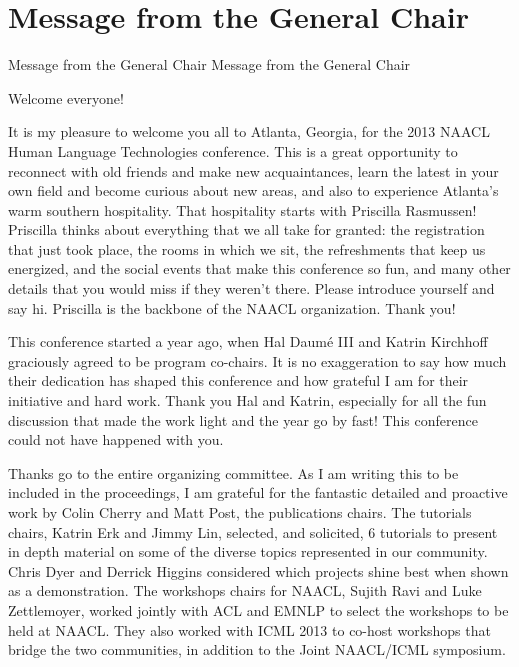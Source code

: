 \section*{Message from the General Chair}\vspace{2em}
\setheaders%
    {Message from the General Chair}%
    {Message from the General Chair}
\thispagestyle{emptyheader}
\begin{large}
\setlength{\parskip}{1ex}

\noindent Welcome everyone!

It is my pleasure to welcome you all to Atlanta, Georgia, for the 2013 NAACL Human Language Technologies conference.  This is a great opportunity to reconnect with old friends and make new acquaintances, learn the latest in your own field and become curious about new areas, and also to experience Atlanta's warm southern hospitality.
That hospitality starts with Priscilla Rasmussen! Priscilla thinks about everything that we all take for granted: the registration that just took place, the rooms in which we sit, the refreshments that keep us energized, and the social events that make this conference so fun, and many other details that you would miss if they weren't there. Please introduce yourself and say hi. Priscilla is the backbone of the NAACL organization. Thank you!

This conference started a year ago, when Hal Daumé III and Katrin Kirchhoff graciously agreed to be program co-chairs. It is no exaggeration to say how much their dedication has shaped this conference and how grateful I am for their initiative and hard work. Thank you Hal and Katrin, especially for all the fun discussion that made the work light and the year go by fast!  This conference could not have happened with you.

Thanks go to the entire organizing committee. As I am writing this to be included in the proceedings, I am grateful for the fantastic detailed and proactive work by Colin Cherry and Matt Post, the publications chairs.  The tutorials chairs, Katrin Erk and Jimmy Lin, selected, and solicited, 6 tutorials to present in depth material on some of the diverse topics represented in our community. Chris Dyer and Derrick Higgins considered which projects shine best when shown as a demonstration.  The workshops chairs for NAACL, Sujith Ravi and Luke Zettlemoyer, worked jointly with ACL and EMNLP to select the workshops to be held at NAACL. They also worked with ICML 2013 to co-host workshops that bridge the two communities, in addition to the Joint NAACL/ICML symposium.


\end{large}
